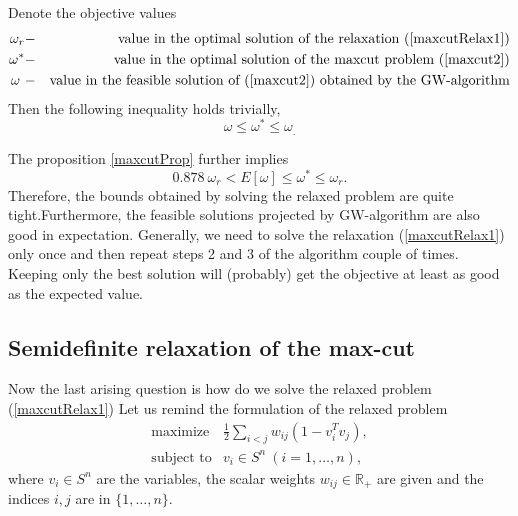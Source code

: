 \documentclass[12pt]{book}
\theoremstyle{definition}
\begin{document}
\rem Denote the objective values 
\begin{eqnarray*}
\omega_r &-& \mbox{value in the optimal solution of the relaxation (\ref{maxcutRelax1})} \\
\omega^* &-& \mbox{value in the optimal solution of the maxcut problem (\ref{maxcut2})} \\
\omega \  &-& \mbox{value in the feasible solution of (\ref{maxcut2}) obtained by the GW-algorithm} 
\end{eqnarray*}
Then the following inequality holds trivially, %
\begin{equation*}
\omega \leq \omega^*\leq \omega_.
\end{equation*}

The proposition \ref{maxcutProp} further implies  
\begin{equation*}
0.878 \ \omega_r < E[\omega] \leq \omega^*\leq \omega_r.
\end{equation*}
Therefore, the bounds obtained by solving the relaxed problem are quite tight.Furthermore, the feasible solutions projected by GW-algorithm are also good in expectation. Generally, we need to solve the relaxation (\ref{maxcutRelax1}) only once and then repeat steps 2 and 3 of the algorithm couple of times. 
Keeping only the best solution will (probably) get the objective at least as good as the expected value.


\subsection{Semidefinite relaxation of the max-cut}

Now the last arising question is how do we solve the relaxed problem (\ref{maxcutRelax1})
Let us remind the formulation of the relaxed problem
\begin{equation*}
\begin{array}{ll}
\mbox{maximize} & \frac{1}{2}\sum_{i<j}w_{ij}(1-v_i^Tv_j ), \\
\mbox{subject to} &  v_i \in S^n \ (i = 1,\dots ,n),
\end{array}
\end{equation*}
where $v_i\in S^n$ are the variables, the scalar weights $w_{ij}\in \mathbb{R}_+$ are given
and the indices $i,j$ are in $\{1,\dots ,n\}$.
\end{document}

